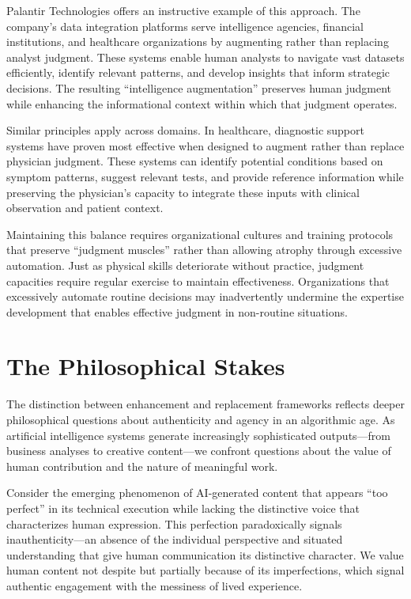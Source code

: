 \documentclass[
  Letterpaper,
]{scrbook}
\begin{document}
Palantir Technologies offers an instructive example of this approach.
The company's data integration platforms serve intelligence agencies,
financial institutions, and healthcare organizations by augmenting
rather than replacing analyst judgment. These systems enable human
analysts to navigate vast datasets efficiently, identify relevant
patterns, and develop insights that inform strategic decisions. The
resulting ``intelligence augmentation'' preserves human judgment while
enhancing the informational context within which that judgment operates.

Similar principles apply across domains. In healthcare, diagnostic
support systems have proven most effective when designed to augment
rather than replace physician judgment. These systems can identify
potential conditions based on symptom patterns, suggest relevant tests,
and provide reference information while preserving the physician's
capacity to integrate these inputs with clinical observation and patient
context.

Maintaining this balance requires organizational cultures and training
protocols that preserve ``judgment muscles'' rather than allowing
atrophy through excessive automation. Just as physical skills
deteriorate without practice, judgment capacities require regular
exercise to maintain effectiveness. Organizations that excessively
automate routine decisions may inadvertently undermine the expertise
development that enables effective judgment in non-routine situations.

\section{The Philosophical Stakes}\label{the-philosophical-stakes}

The distinction between enhancement and replacement frameworks reflects
deeper philosophical questions about authenticity and agency in an
algorithmic age. As artificial intelligence systems generate
increasingly sophisticated outputs---from business analyses to creative
content---we confront questions about the value of human contribution
and the nature of meaningful work.

Consider the emerging phenomenon of AI-generated content that appears
``too perfect'' in its technical execution while lacking the distinctive
voice that characterizes human expression. This perfection paradoxically
signals inauthenticity---an absence of the individual perspective and
situated understanding that give human communication its distinctive
character. We value human content not despite but partially because of
its imperfections, which signal authentic engagement with the messiness
of lived experience.
\end{document}
